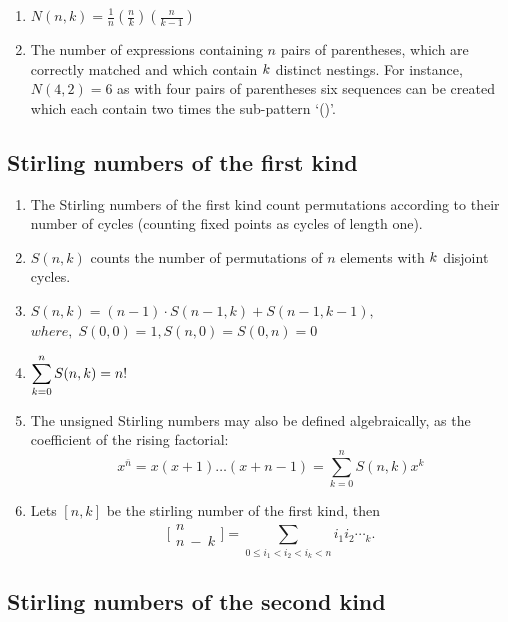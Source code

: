 \begin{enumerate}[resume]
    \item $N(n,k)=\frac{1}{n}\left(\frac{n}{k}\right)\left(\frac{n}{k-1}\right)$
    \item The number of expressions containing $n$ pairs of parentheses, which are correctly matched and which contain $\displaystyle \displaystyle k$ distinct nestings. For instance, $N(4, 2) = 6$ as with four pairs of parentheses six sequences can be created which each contain two times the sub-pattern ‘()’.
\end{enumerate}

\subsection{Stirling numbers of the first kind}

\begin{enumerate}[resume]
    \item The Stirling numbers of the first kind count permutations according to their number of cycles (counting fixed points as cycles of length one).
    \item $S(n,k)$ counts the number of permutations of $n$ elements with $\displaystyle \displaystyle k$ disjoint cycles.
    \item $S(n,k)=(n-1) \cdot S(n-1,k)+S(n-1,k-1),$
    \(where,\; S(0,0)=1,S(n,0)=S(0,n)=0\)
    \item $\displaystyle \displaystyle\sum_{k=0}^{n}S(n,k) = n!$
    \item The unsigned Stirling numbers may also be defined algebraically, as the coefficient of the rising factorial:
    \[\displaystyle x^{\bar{n}} = x(x+1)\dots(x+n-1) = \sum_{k=0}^{n}{ S(n, k) x^k}\]
    \item Lets $[n, k]$ be the stirling number of the first kind, then
    \[\displaystyle \bigl[\!\begin{smallmatrix} n \\ n\ -\ k \end{smallmatrix}\!\bigr] = \sum_{0 \leq i_1 < i_2 < i_k < n}{i_1i_2\dotsi_k.}\]
\end{enumerate}

\subsection{Stirling numbers of the second kind}

